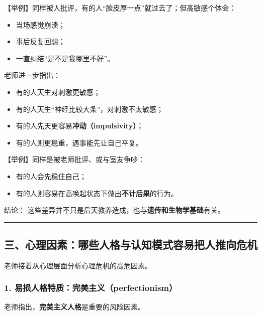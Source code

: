 \documentclass[
  chinese,
  9pt,
  a4paper,
]{ctexart}
\providecommand{\tightlist}{%
  \setlength{\itemsep}{0pt}\setlength{\parskip}{0pt}}
\begin{document}
【举例】同样被人批评，有的人``脸皮厚一点''就过去了；但高敏感个体会：

\begin{itemize}
\tightlist
\item
  当场感觉崩溃；
\item
  事后反复回想；
\item
  一直纠结``是不是我哪里不好''。
\end{itemize}

老师进一步指出：

\begin{itemize}
\tightlist
\item
  有的人天生对刺激更敏感；
\item
  有的人天生``神经比较大条''，对刺激不太敏感；
\item
  有的人先天更容易\textbf{冲动（impulsivity）}；
\item
  有的人则更稳重，遇事能先让自己平复。
\end{itemize}

【举例】同样是被老师批评、或与室友争吵：

\begin{itemize}
\tightlist
\item
  有的人会先稳住自己；
\item
  有的人则容易在高唤起状态下做出\textbf{不计后果}的行为。
\end{itemize}

结论： 这些差异并不只是后天教养造成，也与\textbf{遗传和生物学基础}有关。

\begin{center}\rule{0.5\linewidth}{0.5pt}\end{center}

\subsection{三、心理因素：哪些人格与认知模式容易把人推向危机}\label{ux4e09ux5fc3ux7406ux56e0ux7d20ux54eaux4e9bux4ebaux683cux4e0eux8ba4ux77e5ux6a21ux5f0fux5bb9ux6613ux628aux4ebaux63a8ux5411ux5371ux673a}

老师接着从心理层面分析心理危机的高危因素。

\subsubsection{1.
易损人格特质：完美主义（perfectionism）}\label{ux6613ux635fux4ebaux683cux7279ux8d28ux5b8cux7f8eux4e3bux4e49perfectionism}

老师指出，\textbf{完美主义人格}是重要的风险因素。
\end{document}
